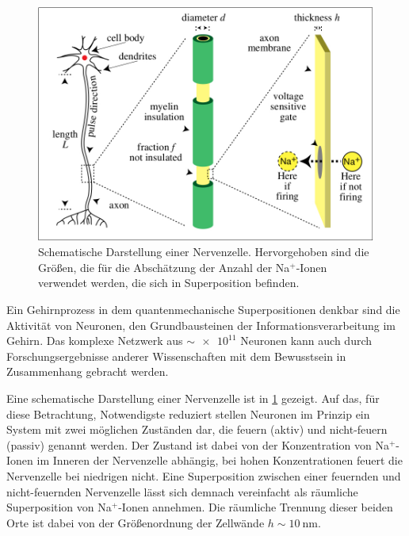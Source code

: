 


\begin{figure}
	\centering
	\includegraphics[scale=0.2]{graphics/neuron_schematic.jpg}
	\caption{Schematische Darstellung einer Nervenzelle. Hervorgehoben sind die Größen, die für die Abschätzung der 
		Anzahl der Na$^{+}$-Ionen verwendet werden, die sich in Superposition befinden.\cite{Tegmark_99} \label{fig:neuron}}
\end{figure}
Ein Gehirnprozess in dem quantenmechanische Superpositionen denkbar sind
die Aktivität von Neuronen, den Grundbausteinen der Informationsverarbeitung im 
Gehirn. Das komplexe Netzwerk aus $\sim \num{e11}$ Neuronen kann auch durch
Forschungsergebnisse anderer Wissenschaften mit dem Bewusstsein in Zusammenhang
gebracht werden. 

Eine schematische Darstellung einer Nervenzelle ist in \cref{fig:neuron} gezeigt.
Auf das, für diese Betrachtung, Notwendigste reduziert stellen Neuronen im Prinzip
ein System mit zwei möglichen Zuständen dar, die feuern (aktiv) und 
nicht-feuern (passiv) genannt werden. Der Zustand ist dabei von der Konzentration
von Na$^{+}$-Ionen im Inneren der Nervenzelle abhängig, bei hohen Konzentrationen
feuert die Nervenzelle bei niedrigen nicht. Eine Superposition zwischen einer 
feuernden und nicht-feuernden Nervenzelle lässt sich demnach vereinfacht als räumliche 
Superposition von Na$^{+}$-Ionen annehmen. Die räumliche Trennung dieser beiden Orte 
ist dabei von der Größenordnung der Zellwände $h \sim \SI{10}{\nano\meter}$.

